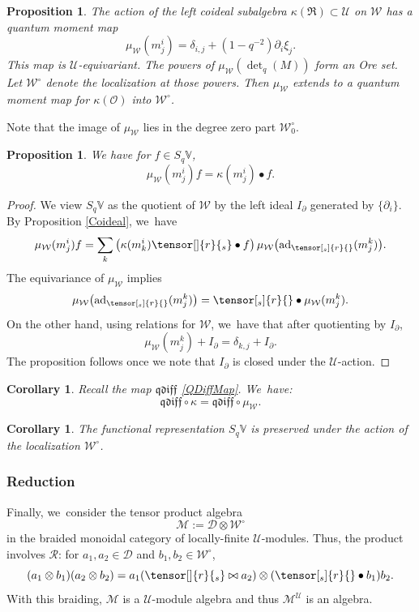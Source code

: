 \documentclass[JEP,XML,SOM,Unicode,published]{cedram}
\newtheorem{prop}[thm]{Proposition}
\newtheorem{cor}[thm]{Corollary}
\theoremstyle{definition}
\newcommand{\OO}{\mathcal{O}}
\newcommand{\UU}{\mathcal{U}}
\newcommand{\DD}{\mathcal{D}}
\newcommand{\WW}{\mathcal{W}}
\newcommand{\WWo}{\WW^\circ}
\newcommand{\MM}{\mathcal{M}}
\newcommand{\del}{\partial}
\newcommand{\ad}{\mathrm{ad}}
\begin{document}
\begin{prop}
The action of the left coideal subalgebra $\kappa(\mathfrak{R})\subset\UU$ on $\WW$ has a quantum moment map
\[
\mu_\WW(m^i_j)= \delta_{i,j}+(1-q^{-2})\del_i\xi_j.
\]
This map is $\UU$-equivariant.
The powers of $\mu_\WW(\det_q(M))$ form an Ore set.
Let $\WWo$ denote the localization at those powers.
Then $\mu_\WW$ extends to a quantum moment map for $\kappa(\OO)$ into $\WWo$.
\end{prop}

Note that the image of $\mu_\WW$ lies in the degree zero part $\WWo_0$.

\begin{prop}\label{WBasic}
We have for $f\in S_q\mathbb{V}$,
\[
\mu_\WW(m^i_j) f=\kappa(m^i_j)\bullet f.
\]
\end{prop}

\begin{proof}
We view $S_q\mathbb{V}$ as the quotient of $\WW$ by the left ideal $I_\del$ generated by $\{ \del_i\}$.
By Proposition \ref{Coideal}, we~have
\[
\mu_\WW(m^i_j)f=\sum_{k}\left(\kappa(m^i_k)\tensor[]{r}{_s} \bullet f\right)\mu_\WW\big(\ad_{\tensor[_s]{r}{}}(m^k_{j})\big).
\]
The equivariance of $\mu_\WW$ implies
\[
\mu_\WW\big(\ad_{\tensor[_s]{r}{}}(m^k_{j})\big)=\tensor[_s]{r}{}\bullet\mu_\WW(m^k_j).
\]
On the other hand, using relations for $\WW$, we~have that after quotienting by $I_\del$,
\[
\mu_\WW(m^k_j) +I_\del=\delta_{k,j}+I_\del.
\]
The proposition follows once we note that $I_\del$ is closed under the $\UU$-action.
\end{proof}

\begin{cor}\label{QDiffMoment}
Recall the map $\mathfrak{qdiff}$ \eqref{QDiffMap}. We~have:
\[
\mathfrak{qdiff}\circ\kappa = \mathfrak{qdiff}\circ\mu_\WW.
\]
\end{cor}

\begin{cor}
The functional representation $S_q\mathbb{V}$ is preserved under the action of the localization $\WWo$.
\end{cor}

\subsubsection{Reduction}\label{Reduct}
Finally, we~consider the tensor product algebra
\[
\MM:=\DD\otimes\WWo
\]
in the braided monoidal category of locally-finite $\UU$-modules.
Thus, the product involves $\mathcal{R}$: for $a_1,a_2\in\DD$ and $b_1,b_2\in\WWo$,
\[
(a_1\otimes b_1)(a_2\otimes b_2)=a_1(\tensor[]{r}{_s}\bowtie a_2)\otimes (\tensor[_s]{r}{}\bullet b_1)b_2.
\]
With this braiding, $\MM$ is a $\UU$-module algebra and thus $\MM^\UU$ is an algebra.
\end{document}
